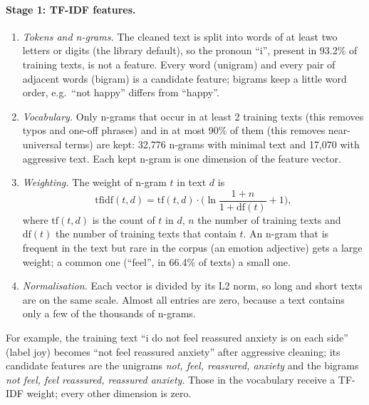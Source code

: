 \documentclass[11pt,a4paper]{article}
\begin{document}
\paragraph{Stage 1: TF-IDF features.}
\begin{enumerate}[leftmargin=*,itemsep=1pt]
  \item \emph{Tokens and n-grams.} The cleaned text is split into words of at least two letters or digits (the library default), so the pronoun ``i'', present in 93.2\% of training texts, is not a feature. Every word (unigram) and every pair of adjacent words (bigram) is a candidate feature; bigrams keep a little word order, e.g.\ ``not happy'' differs from ``happy''.
  \item \emph{Vocabulary.} Only n-grams that occur in at least 2 training texts (this removes typos and one-off phrases) and in at most 90\% of them (this removes near-universal terms) are kept: 32,776 n-grams with minimal text and 17,070 with aggressive text. Each kept n-gram is one dimension of the feature vector.
  \item \emph{Weighting.} The weight of n-gram $t$ in text $d$ is
  \begin{equation}
  \text{tfidf}(t,d)=\text{tf}(t,d)\cdot\Big(\ln\frac{1+n}{1+\text{df}(t)}+1\Big),
  \end{equation}
  where $\text{tf}(t,d)$ is the count of $t$ in $d$, $n$ the number of training texts and $\text{df}(t)$ the number of training texts that contain $t$. An n-gram that is frequent in the text but rare in the corpus (an emotion adjective) gets a large weight; a common one (``feel'', in 66.4\% of texts) a small one.
  \item \emph{Normalisation.} Each vector is divided by its L2 norm, so long and short texts are on the same scale. Almost all entries are zero, because a text contains only a few of the thousands of n-grams.
\end{enumerate}
For example, the training text ``i do not feel reassured anxiety is on each side'' (label joy) becomes ``not feel reassured anxiety'' after aggressive cleaning; its candidate features are the unigrams \emph{not, feel, reassured, anxiety} and the bigrams \emph{not feel, feel reassured, reassured anxiety}. Those in the vocabulary receive a TF-IDF weight; every other dimension is zero.
\end{document}
